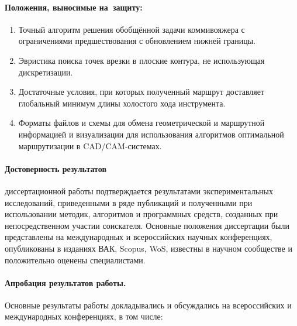 \paragraph*{Положения, выносимые на~защиту:}

\begin{enumerate}
  \item
    Точный алгоритм решения обобщённой задачи коммивояжера
    с ограничениями предшествования
    с обновлением нижней границы.
  \item
    Эвристика поиска точек врезки в плоские контура,
    не использующая дискретизации.
  \item
    Достаточные условия, при которых полученный маршрут
    доставляет глобальный минимум длины холостого хода инструмента.
  \item
    Форматы файлов и схемы для обмена геометрической и маршрутной информацией
    и визуализации для использования алгоритмов оптимальной маршрутизации
    в CAD/CAM-системах.
\end{enumerate}

\paragraph*{Достоверность результатов}
диссертационной работы подтверждается результатами экспериментальных исследований,
приведенными в ряде публикаций и полученными при использовании методик, алгоритмов и программных средств,
созданных при непосредственном участии соискателя.
Основные положения диссертации были представлены на международных и всероссийских научных конференциях,
опубликованы в изданиях ВАК, Scopus, WoS,
известны в научном сообществе и положительно оценены специалистами.

\paragraph*{Апробация результатов работы.}
Основные результаты работы докладывались и обсуждались на всероссийских и международных конференциях, в том числе:

